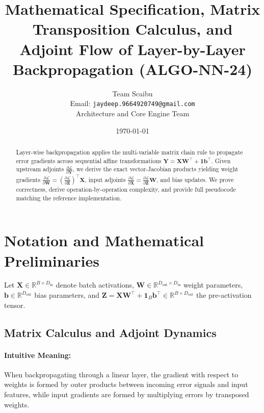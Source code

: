 \documentclass[11pt]{article}
\title{\textbf{Mathematical Specification, Matrix Transposition Calculus, and Adjoint Flow of Layer-by-Layer Backpropagation (ALGO-NN-24)}}
\author{Team Scaibu \\ \small Email: \texttt{jaydeep.9664920749@gmail.com} \\ \small Architecture and Core Engine Team}
\date{\today}
\begin{document}
\maketitle

\begin{abstract}
Layer-wise backpropagation applies the multi-variable matrix chain rule to propagate error gradients across sequential affine transformations $\mathbf{Y} = \mathbf{X} \mathbf{W}^\top + \mathbf{1} \mathbf{b}^\top$. Given upstream adjoints $\frac{\partial \mathcal{L}}{\partial \mathbf{Y}}$, we derive the exact vector-Jacobian products yielding weight gradients $\frac{\partial \mathcal{L}}{\partial \mathbf{W}} = \left(\frac{\partial \mathcal{L}}{\partial \mathbf{Z}}\right)^\top \mathbf{X}$, input adjoints $\frac{\partial \mathcal{L}}{\partial \mathbf{X}} = \frac{\partial \mathcal{L}}{\partial \mathbf{Z}} \mathbf{W}$, and bias updates. We prove correctness, derive operation-by-operation complexity, and provide full pseudocode matching the reference implementation.
\end{abstract}

\section{Notation and Mathematical Preliminaries}
\label{sec:notation}

Let $\mathbf{X} \in \mathbb{R}^{B \times D_{\mathrm{in}}}$ denote batch activations, $\mathbf{W} \in \mathbb{R}^{D_{\mathrm{out}} \times D_{\mathrm{in}}}$ weight parameters, $\mathbf{b} \in \mathbb{R}^{D_{\mathrm{out}}}$ bias parameters, and $\mathbf{Z} = \mathbf{X} \mathbf{W}^\top + \mathbf{1}_B \mathbf{b}^\top \in \mathbb{R}^{B \times D_{\mathrm{out}}}$ the pre-activation tensor.

\subsection{Matrix Calculus and Adjoint Dynamics}
\paragraph{Intuitive Meaning:} When backpropagating through a linear layer, the gradient with respect to weights is formed by outer products between incoming error signals and input features, while input gradients are formed by multiplying errors by transposed weights.
\end{document}
